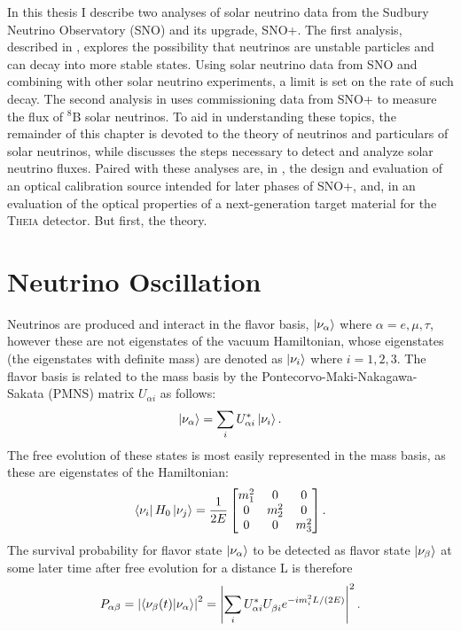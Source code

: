 In this thesis I describe two analyses of solar neutrino data from the Sudbury Neutrino Observatory (SNO) and its upgrade, SNO+.
The first analysis, described in , explores the possibility that neutrinos are unstable particles and can decay into more stable states.
Using solar neutrino data from SNO and combining with other solar neutrino experiments, a limit is set on the rate of such decay. 
The second analysis in  uses commissioning data from SNO+ to measure the flux of $^8$B solar neutrinos. 
To aid in understanding these topics, the remainder of this chapter is devoted to the theory of neutrinos and particulars of solar neutrinos, while  discusses the steps necessary to detect and analyze solar neutrino fluxes.
Paired with these analyses are, in , the design and evaluation of an optical calibration source intended for later phases of SNO+, and, in  an evaluation of the optical properties of a next-generation target material for the \textsc{Theia} detector.
But first, the theory.


\section{Neutrino Oscillation}
\label{ch:theory}

Neutrinos are produced and interact in the flavor basis, $\ket{\nu_{\alpha}}$ where $\alpha = {e,\mu,\tau}$, however these are not eigenstates of the vacuum Hamiltonian, whose eigenstates (the eigenstates with definite mass) are denoted as $\ket{\nu_i}$ where $i = {1,2,3}$. 
The flavor basis is related to the mass basis by the Pontecorvo-Maki-Nakagawa-Sakata (PMNS) matrix $U_{\alpha i}$ as follows:
\begin{equation}
\ket{\nu_{\alpha}} = \sum_i U^*_{\alpha i} \ket{\nu_i}.
\end{equation}
The free evolution of these states is most easily represented in the mass basis, as these are eigenstates of the Hamiltonian:
\begin{equation}
\bra{\nu_i}H_{0}\ket{\nu_j} = \frac{1}{2E}\begin{bmatrix}
m_1^2 & 0 & 0 \\
0 & m_2^2 & 0 \\
0 & 0 & m_3^2
\end{bmatrix}.
\end{equation}
The survival probability for flavor state $\ket{\nu_\alpha}$ to be detected as flavor state $\ket{\nu_\beta}$ at some later time after free evolution for a distance L is therefore
\begin{equation}
P_{\alpha\beta} = \left|\braket{\nu_\beta(t)}{\nu_\alpha}\right|^2 = \left|\sum_i U^*_{\alpha i} U^{}_{\beta i} e^{- i m_i^2 L/(2E)} \right|^2.
\end{equation}

